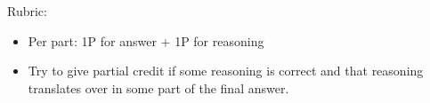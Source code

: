 \documentclass{article}
\theoremstyle{definition}
\begin{document}
\begin{solution}
{\color{red} Rubric:
\begin{itemize}
\item Per part: 1P for answer + 1P for reasoning
\item Try to give partial credit if some reasoning is correct and that reasoning translates over in some part of the final answer.
\end{itemize}}
\end{solution}
\end{document}
